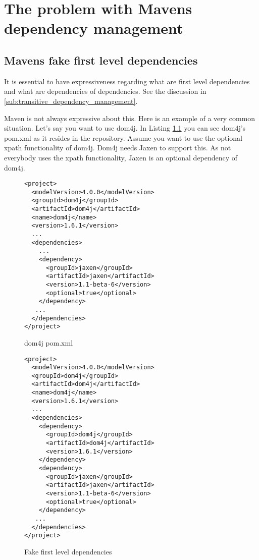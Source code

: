 \chapter{The problem with Mavens dependency management} %
\label{cha:the_problem_with_mavens_dependency_management}

\section{Mavens fake first level dependencies} %
\label{sec:mavens_fake_first_level_dependencies}

It is essential to have expressiveness regarding what are first level dependencies and what are dependencies of dependencies. See the discussion in \ref{sub:transitive_dependency_management}.

Maven is not always expressive about this. Here is an example of a very common situation. Let's say you want to use dom4j. In Listing \ref{dom4jPom} you can see dom4j's pom.xml as it resides in the repository. Assume you want to use the optional xpath functionality of dom4j. Dom4j needs Jaxen to support this. As not everybody uses the xpath functionality, Jaxen is an optional dependency of dom4j. 

\begin{figure}
	\label{dom4jPom}
	\caption{dom4j pom.xml}
	\begin{Verbatim}
<project>
  <modelVersion>4.0.0</modelVersion>
  <groupId>dom4j</groupId>
  <artifactId>dom4j</artifactId>
  <name>dom4j</name>
  <version>1.6.1</version>
  ...
  <dependencies>
    ...
    <dependency>
      <groupId>jaxen</groupId>
      <artifactId>jaxen</artifactId>
      <version>1.1-beta-6</version>
      <optional>true</optional>
    </dependency>
   ...
  </dependencies>
</project>	
	\end{Verbatim}	
\end{figure}

\begin{figure}
	\label{fakeFirstLevelPom}
	\caption{Fake first level dependencies}
	\begin{Verbatim}
<project>
  <modelVersion>4.0.0</modelVersion>
  <groupId>dom4j</groupId>
  <artifactId>dom4j</artifactId>
  <name>dom4j</name>
  <version>1.6.1</version>
  ...
  <dependencies>
    <dependency>
      <groupId>dom4j</groupId>
	  <artifactId>dom4j</artifactId>
	  <version>1.6.1</version>
    </dependency>
    <dependency>
      <groupId>jaxen</groupId>
      <artifactId>jaxen</artifactId>
      <version>1.1-beta-6</version>
      <optional>true</optional>
    </dependency>
   ...
  </dependencies>
</project>	
	\end{Verbatim}	
\end{figure}

